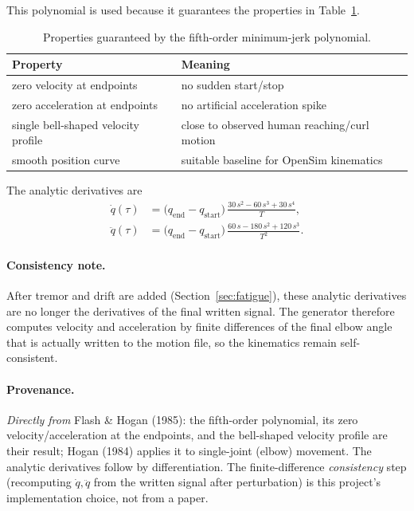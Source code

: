 \documentclass[11pt]{article}
\begin{document}
This polynomial is used because it guarantees the properties in
Table~\ref{tab:mj-props}.

\begin{table}[h]
\centering
\begin{tabular}{ll}
\toprule
\textbf{Property} & \textbf{Meaning} \\
\midrule
zero velocity at endpoints & no sudden start/stop \\
zero acceleration at endpoints & no artificial acceleration spike \\
single bell-shaped velocity profile & close to observed human reaching/curl motion \\
smooth position curve & suitable baseline for OpenSim kinematics \\
\bottomrule
\end{tabular}
\caption{Properties guaranteed by the fifth-order minimum-jerk polynomial.}
\label{tab:mj-props}
\end{table}

The analytic derivatives are
\begin{align}
\dot q(\tau)  &= \bigl(q_{\text{end}} - q_{\text{start}}\bigr)
\,\frac{30\,s^{2} - 60\,s^{3} + 30\,s^{4}}{T}, \\[4pt]
\ddot q(\tau) &= \bigl(q_{\text{end}} - q_{\text{start}}\bigr)
\,\frac{60\,s - 180\,s^{2} + 120\,s^{3}}{T^{2}}.
\end{align}

\paragraph{Consistency note.} After tremor and drift are added (Section~\ref{sec:fatigue}),
these analytic derivatives are no longer the derivatives of the final written
signal. The generator therefore computes velocity and acceleration by finite
differences of the final elbow angle that is actually written to the motion file,
so the kinematics remain self-consistent.

\paragraph{Provenance.} \textit{Directly from} Flash \& Hogan (1985): the
fifth-order polynomial, its zero velocity/acceleration at the endpoints, and the
bell-shaped velocity profile are their result; Hogan (1984) applies it to
single-joint (elbow) movement. The analytic derivatives follow by
differentiation. The finite-difference \emph{consistency} step (recomputing
$\dot q,\ddot q$ from the written signal after perturbation) is this project's
implementation choice, not from a paper.
\end{document}
